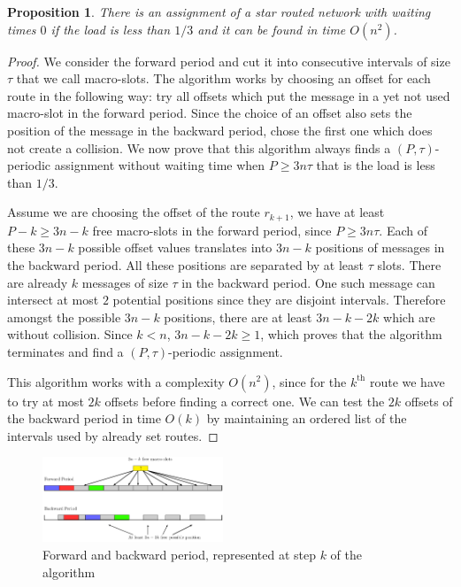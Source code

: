 \documentclass[a4paper,10pt]{article}
\newtheorem{proposition}{Proposition}
\begin{document}
    
    \begin{proposition}
    There is an assignment of a star routed network with waiting times $0$ if the load is less than $1/3$ and it can be found in time $O(n^2)$.
    \end{proposition}
    \begin{proof}
     We consider the forward period and cut it into consecutive intervals of size $\tau$ that we call macro-slots. The algorithm works by choosing an offset for each route in the following way: try all offsets which put the message in a yet not used macro-slot in the forward
     period. Since the choice of an offset also sets the position of the message in the backward period, chose the first one which does not create a collision. We now prove that this algorithm always finds a $(P,\tau)$-periodic assignment without waiting time when $P \geq 3n\tau$ that is the load is less than $1/3$.
     
     Assume we are choosing the offset of the route $r_{k+1}$, we have at least $P - k \geq 3n - k$ free macro-slots in the forward period, since $P \geq 3n\tau$. Each of these $3n - k$ possible offset values translates into $3n - k$ positions of messages in the backward period. All these positions are separated by at least $\tau$ slots. There are already $k$ messages of size $\tau$ in the backward period. One such message can intersect at most $2$ potential positions since they are disjoint intervals. Therefore  amongst the possible $3n - k$ positions, there are  at least $3n - k -2k$ which are without collision. Since $k < n$, $3n - k -2k \geq 1$, which proves that the algorithm terminates and find a  $(P,\tau)$-periodic assignment. 
   
     This algorithm works with a complexity $O(n^2)$, since for the $k^{\text{th}}$ route we have to try at most $2k$ offsets before finding a correct one. We can test the $2k$ offsets of the backward period in time $O(k)$ by maintaining an ordered list of the intervals used by already set routes.
     \end{proof}
     \begin{figure}
      \begin{center}
      \includegraphics[width=0.48\textwidth]{ex3nt.pdf}
      \end{center}
      \caption{Forward and backward period, represented at step $k$ of the algorithm}
      \end{figure}
\end{document}
